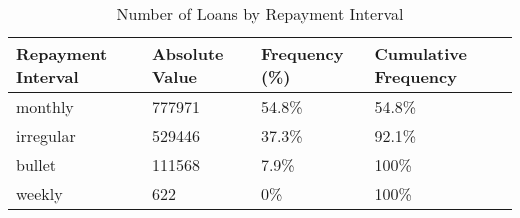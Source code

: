 \begin{table}[!htb]
\centering
\begin{tabular}{llll}
  \hline
Repayment Interval & Absolute Value & Frequency (\%) & Cumulative Frequency \\ 
  \hline
monthly & 777971 & 54.8\% & 54.8\% \\ 
  irregular & 529446 & 37.3\% & 92.1\% \\ 
  bullet & 111568 & 7.9\% & 100\% \\ 
  weekly & 622 & 0\% & 100\% \\ 
   \hline
\end{tabular}
\caption{Number of Loans by Repayment Interval} 
\label{tab:Loan_Repayment_Interval}
\end{table}
